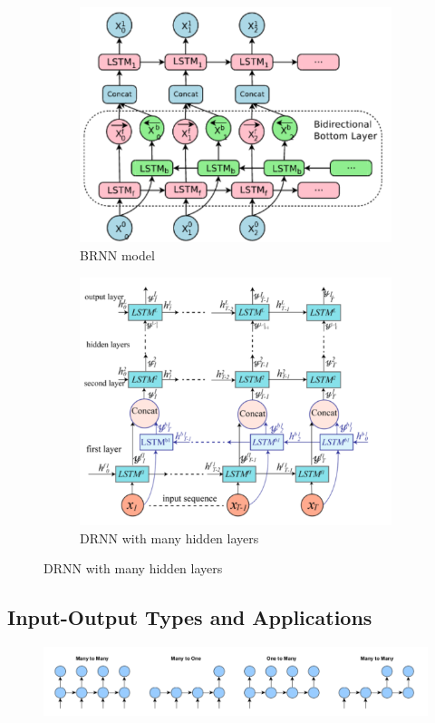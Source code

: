 \begin{figure}[H]
    \centering
    \begin{subfigure}[b]{0.45\textwidth}
        \includegraphics[width=\linewidth]{img/BRNN.png}
        \caption{BRNN model}
    \end{subfigure}
    \begin{subfigure}[b]{0.30\textwidth}
        \includegraphics[width=\linewidth]{img/DRNNs.png}
        \caption{DRNN with many hidden layers}
    \end{subfigure}
\end{figure}
\subsection{Input-Output Types and Applications}
\begin{figure}[H]
    \centering
    \includegraphics[width=0.75\linewidth]{img/LSTMs_IO.png}
\end{figure}

